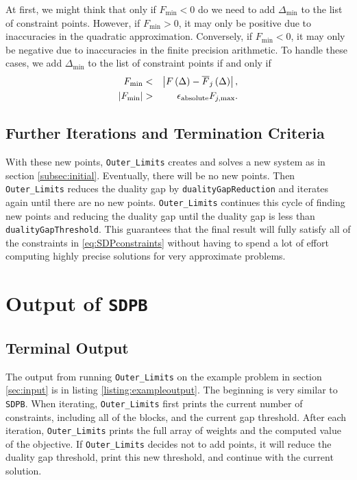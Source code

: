 \documentclass[12pt]{article}
\numberwithin{equation}{section}
\newcommand\SDPB{\texttt{SDPB}}
\begin{document}
At first, we might think that only if $F_{\min}<0$ do we need to add
$\Delta_{\min}$ to the list of constraint points.  However, if
$F_{\min}>0$, it may only be positive due to inaccuracies in the
quadratic approximation.  Conversely, if $F_{\min}<0$, it may only be
negative due to inaccuracies in the finite precision arithmetic.  To
handle these cases, we add $\Delta_{\min}$ to the list of constraint
points if and only if
\begin{eqnarray}
  F_{\min} & < & \left| F\left(\Delta\right) - \overline{F}_j\left(\Delta\right) \right|, \\
  \left|F_{\min}\right| & > & \epsilon_{\rm{absolute}}F_{j,\max}.
\end{eqnarray}

\subsection{Further Iterations and Termination Criteria}
\label{subsec:furtheriterations}

With these new points, \texttt{Outer\_Limits} creates and solves a new
system as in section \ref{subsec:initial}.  Eventually, there will be
no new points.  Then \texttt{Outer\_Limits} reduces the duality gap by
\texttt{dualityGapReduction} and iterates again until there are no new
points.  \texttt{Outer\_Limits} continues this cycle of finding new
points and reducing the duality gap until the duality gap is less than
\texttt{dualityGapThreshold}.  This guarantees that the final result
will fully satisfy all of the constraints in \ref{eq:SDPconstraints}
without having to spend a lot of effort computing highly precise
solutions for very approximate problems.

\section{Output of \SDPB}

\subsection{Terminal Output}

The output from running \texttt{Outer\_Limits} on the example problem
in section \ref{sec:input} is in listing
\ref{listing:exampleoutput}. The beginning is very similar to
\texttt{SDPB}.  When iterating, \texttt{Outer\_Limits} first prints
the current number of constraints, including all of the blocks, and
the current gap threshold.  After each iteration,
\texttt{Outer\_Limits} prints the full array of weights and the
computed value of the objective.  If \texttt{Outer\_Limits} decides
not to add points, it will reduce the duality gap threshold, print
this new threshold, and continue with the current solution.
\end{document}
